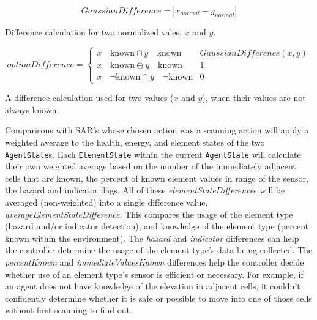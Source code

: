 \begin{capeq}
\begin{equation} \label{eq:gaussian_difference}
  GaussianDifference = |x_{normal} - y_{normal}|
\end{equation}
\caption[Gaussian Difference]{Difference calculation for two normalized vales, $x$ and $y$.}
\end{capeq}

\begin{capeq}
\begin{equation} \label{eq:option_difference}
  optionDifference =
  \begin{cases}
    x \quad \text{known} \cap y \quad \text{known} & GaussianDifference(x,y) \\
    x \quad \text{known} \oplus y \quad \text{known} & 1 \\
    x \quad \neg \text{known} \cap y \quad \neg \text{known} & 0
  \end{cases}
\end{equation}
\caption[Option Difference]{A difference calculation used for two values ($x$ and $y$), when their values are not always known.}
\end{capeq}

Comparisons with SAR's whose chosen action was a scanning action will apply a weighted average to the health, energy, and element states of the two \texttt{AgentState}s.
Each \texttt{ElementState} within the current \texttt{AgentState} will calculate their own weighted average based on the number of the immediately adjacent cells that are known, the percent of known element values in range of the sensor, the hazard and indicator flags.
All of these \textit{elementStateDifference}s will be averaged (non-weighted) into a single difference value, \textit{averageElementStateDifference}.
This compares the usage of the element type (hazard and/or indicator detection), and knowledge of the element type (percent known within the environment).
The \textit{hazard} and \textit{indicator} differences can help the controller determine the usage of the element type's data being collected.
The \textit{percentKnown} and \textit{immediateValuesKnown} differences help the controller decide whether use of an element type's sensor is efficient or necessary.
For example, if an agent does not have knowledge of the elevation in adjacent cells, it couldn't confidently determine whether it is safe or possible to move into one of those cells without first scanning to find out.


